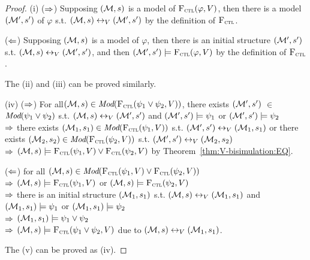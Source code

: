 \documentclass[twoside,11pt]{article}
\begin{document}
	\begin{proof}
		(i) ($\Rightarrow$) Supposing $({\cal M}, s)$ is a model of ${\textsc{F}_{\textsc{ctl}}}(\varphi, V)$, then there is a model $({\cal M}',s')$ of $\varphi$ s.t. $({\cal M},s) \leftrightarrow_V ({\cal M}',s')$ by the definition of ${\textsc{F}_{\textsc{ctl}}}$.
		
		($\Leftarrow$) Supposing $({\cal M}, s)$ is a model of $\varphi$, then there is an initial structure $({\cal M}',s')$ s.t. $({\cal M},s) \leftrightarrow_V ({\cal M}',s')$, and then $({\cal M}',s') \models {\textsc{F}_{\textsc{ctl}}}(\varphi, V)$ by the definition of ${\textsc{F}_{\textsc{ctl}}}$.
		
		The (ii) and (iii) can be proved similarly.
		
		(iv) ($\Rightarrow$) For all$({\cal M},s)\in \textit{Mod}({\textsc{F}_{\textsc{ctl}}}(\psi_1 \vee \psi_2, V))$, there exists $({\cal M}',s')$ $\in$  $\textit{Mod}(\psi_1\vee \psi_2)$ s.t. $({\cal M},s) \leftrightarrow_V ({\cal M}',s')$ and $({\cal M}',s') \models \psi_1$ or $({\cal M}',s') \models \psi_2$ \\
		$\Rightarrow$ there exists $({\cal M}_1,s_1) \in \textit{Mod}({\textsc{F}_{\textsc{ctl}}}(\psi_1, V))$ s.t. $({\cal M}',s') \leftrightarrow_V ({\cal M}_1,s_1)$ or there exists $({\cal M}_2,s_2) \in \textit{Mod}({\textsc{F}_{\textsc{ctl}}}(\psi_2, V))$ s.t. $({\cal M}',s') \leftrightarrow_V ({\cal M}_2,s_2)$ \\
		$\Rightarrow$ $({\cal M},s) \models {\textsc{F}_{\textsc{ctl}}}(\psi_1, V) \vee {\textsc{F}_{\textsc{ctl}}}(\psi_2, V)$ by Theorem~\ref{thm:V-bisimulation:EQ}.
		
		($\Leftarrow$) for all $({\cal M},s) \in \textit{Mod}({\textsc{F}_{\textsc{ctl}}}(\psi_1, V) \vee {\textsc{F}_{\textsc{ctl}}}(\psi_2, V))$\\
		$\Rightarrow$ $({\cal M},s) \models {\textsc{F}_{\textsc{ctl}}}(\psi_1,V)$ or $({\cal M},s) \models {\textsc{F}_{\textsc{ctl}}}(\psi_2,V)$\\
		$\Rightarrow$ there is an initial structure $({\cal M}_1,s_1)$ s.t. $({\cal M},s) \leftrightarrow_V ({\cal M}_1,s_1)$ and $({\cal M}_1,s_1) \models \psi_1$ or  $({\cal M}_1,s_1) \models \psi_2$\\
		$\Rightarrow$ $({\cal M}_1,s_1) \models \psi_1 \vee \psi_2$\\
		$\Rightarrow$ $({\cal M},s) \models {\textsc{F}_{\textsc{ctl}}}(\psi_1 \vee \psi_2, V)$ due to $({\cal M},s) \leftrightarrow_V ({\cal M}_1,s_1)$.
		
		The (v) can be proved as (iv).
	\end{proof}
	
	
	
\end{document}

